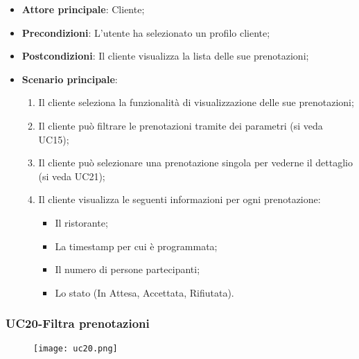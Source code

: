 \begin{itemize}
\item \textbf{Attore principale}: Cliente;
\item \textbf{Precondizioni}: L'utente ha selezionato un profilo cliente;
\item \textbf{Postcondizioni}: Il cliente visualizza la lista delle sue prenotazioni;
\item \textbf{Scenario principale}:
\begin{enumerate}
\item Il cliente seleziona la funzionalità di visualizzazione delle sue prenotazioni;
\item Il cliente può filtrare le prenotazioni tramite dei parametri (si veda UC15);
\item Il cliente può selezionare una prenotazione singola per vederne il dettaglio (si veda UC21);
\item Il cliente visualizza le seguenti informazioni per ogni prenotazione:
\begin{itemize}
\item Il ristorante;
\item La timestamp per cui è programmata;
\item Il numero di persone partecipanti;
\item Lo stato (In Attesa, Accettata, Rifiutata).
\end{itemize}
\end{enumerate}
\end{itemize}

\subsubsection{UC20-Filtra prenotazioni}
\begin{figure}[h] \texttt{[image: uc20.png]} \end{figure}

